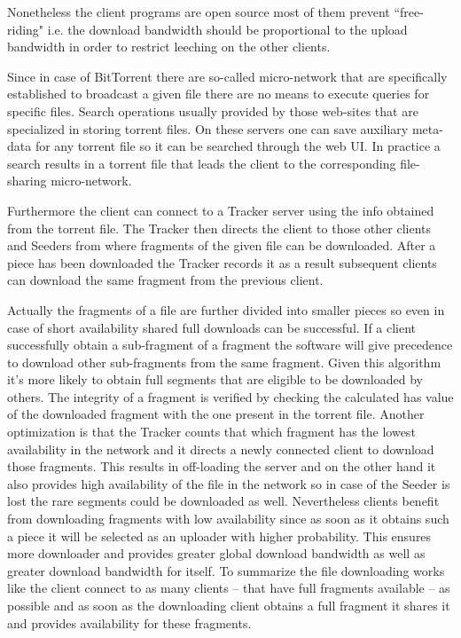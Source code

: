 \documentclass[a4paper]{article}
\begin{document}
Nonetheless the client programs are open source most of them prevent ``free-riding" i.e. the download bandwidth should
be proportional to the upload bandwidth in order to restrict leeching on the other clients.

Since in case of BitTorrent there are so-called micro-network that are specifically established to broadcast a given
file there are no means to execute queries for specific files. Search operations usually provided by those web-sites
that are specialized in storing torrent files. On these servers one can save auxiliary meta-data for any torrent file
so it can be searched through the web UI. In practice a search results in a torrent file that leads the client to the
corresponding file-sharing micro-network.

Furthermore the client can connect to a Tracker server using the info obtained from the torrent file. The Tracker then
directs the client to those other clients and Seeders from where fragments of the given file can be downloaded. After a
piece has been downloaded the Tracker records it as a result subsequent clients can download the same fragment from the
previous client.

Actually the fragments of a file are further divided into smaller pieces so even in case of short availability shared
full downloads can be successful. If a client successfully obtain a sub-fragment of a fragment the software will give
precedence to download other sub-fragments from the same fragment. Given this algorithm it's more likely to obtain full
segments that are eligible to be downloaded by others. The integrity of a fragment is verified by checking the
calculated has value of the downloaded fragment with the one present in the torrent file. Another optimization is that
the Tracker counts that which fragment has the lowest availability in the network and it directs a newly connected
client to download those fragments. This results in off-loading the server and on the other hand it also provides high
availability of the file in the network so in case of the Seeder is lost the rare segments could be downloaded as well.
Nevertheless clients benefit from downloading fragments with low availability since as soon as it obtains such a piece
it will be selected as an uploader with higher probability. This ensures more downloader and provides greater global
download bandwidth as well as greater download bandwidth for itself. To summarize the file downloading works like the
client connect to as many clients -- that have full fragments available -- as possible and as soon as the downloading
client obtains a full fragment it shares it and provides availability for these fragments.
\end{document}
